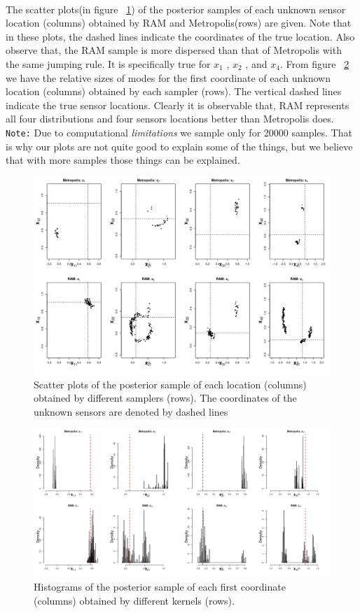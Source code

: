 \documentclass{article}
\begin{document}
\paragraph{}The scatter plots(in figure ~\ref{fig:exa3.1}) of the posterior samples of each
unknown sensor location (columns) obtained by RAM and Metropolis(rows) are given. Note that in these plots, the dashed lines indicate the coordinates of the true location. Also observe that, the RAM sample is more dispersed than that
of Metropolis with the same jumping rule. It is specifically true for $x_1$ , $x_2$ , and $x_4$. From figure ~\ref{fig:exa3.2} we have the relative sizes of modes for the first
coordinate of each unknown location (columns) obtained by each
sampler (rows). The vertical dashed
lines indicate the true sensor locations. Clearly it is observable that, RAM represents all four
distributions and four sensors locations better than Metropolis does.
\texttt{Note:} Due to computational \textit{limitations} we sample only for 20000 samples. That is why our plots are not quite good to explain some of the things, but we believe that with more samples those things can be explained.
\begin{figure}[!htbp]
    \centering
    \includegraphics[width=\textwidth]{20000-3a-bold.png}
    \caption{Scatter plots of the posterior sample of each location (columns) obtained by different samplers (rows). The coordinates of the unknown sensors are denoted by
dashed lines}
    \label{fig:exa3.1}
\end{figure}
\begin{figure}[!htbp]
    \centering
    \includegraphics[width=\textwidth]{20000-3b-bold2.png}
    \caption{ Histograms of the posterior sample of each first coordinate (columns) obtained by different kernels (rows).}
    \label{fig:exa3.2}
\end{figure}
\clearpage
\end{document}
